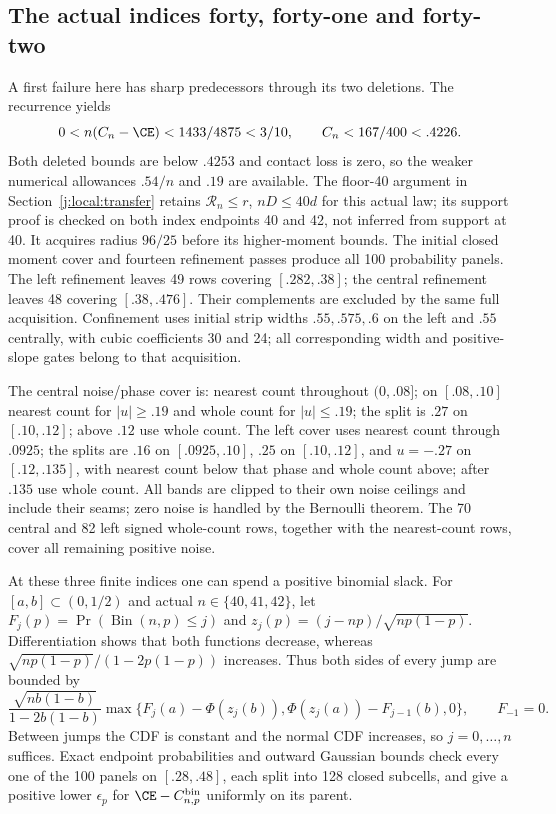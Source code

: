 \subsection{The actual indices forty, forty-one and forty-two}
\label{j:finite:4042}
A first failure here has sharp predecessors through its two deletions.
The recurrence yields
\[
0<n(C_n-\CE)<1433/4875<3/10,\qquad C_n<167/400<.4226.
\]
Both deleted bounds are below $.4253$ and contact loss is zero, so the
weaker numerical allowances $.54/n$ and $.19$ are available.
The floor-40 argument in Section~\ref{j:local:transfer} retains
$\mathcal R_n\le r$, $nD\le40d$ for this actual law; its support
proof is checked on both index endpoints 40 and 42, not inferred from
support at 40. It acquires radius $96/25$ before its higher-moment bounds.
The initial closed moment cover and fourteen refinement passes produce
all 100 probability panels. The left refinement leaves 49 rows covering
$[.282,.38]$; the central refinement leaves 48 covering $[.38,.476]$.
Their complements are excluded by the same full acquisition.
Confinement uses initial strip widths $.55,.575,.6$ on the left and
$.55$ centrally, with cubic coefficients 30 and 24; all corresponding
width and positive-slope gates belong to that acquisition.

The central noise/phase cover is: nearest count throughout $(0,.08]$;
on $[.08,.10]$ nearest count for $|u|\ge.19$ and whole count for
$|u|\le.19$; the split is $.27$ on $[.10,.12]$; above $.12$ use
whole count. The left cover uses nearest count through $.0925$;
the splits are $.16$ on $[.0925,.10]$, $.25$ on $[.10,.12]$,
and $u=-.27$ on $[.12,.135]$, with nearest count below that phase
and whole count above; after $.135$ use whole count.
All bands are clipped to their own noise ceilings and include their seams;
zero noise is handled by the Bernoulli theorem. The 70 central and
82 left signed whole-count rows, together with the nearest-count rows,
cover all remaining positive noise.

At these three finite indices one can spend a positive binomial slack.
For $[a,b]\subset(0,1/2)$ and actual $n\in\{40,41,42\}$, let
$F_j(p)=\Pr(\operatorname{Bin}(n,p)\le j)$ and
$z_j(p)=(j-np)/\sqrt{np(1-p)}$. Differentiation shows that both
functions decrease, whereas $\sqrt{np(1-p)}/(1-2p(1-p))$ increases.
Thus both sides of every jump are bounded by
\begin{equation}\label{j:finite:binomialslack}
\frac{\sqrt{nb(1-b)}}{1-2b(1-b)}
\max\{F_j(a)-\Phi(z_j(b)),\Phi(z_j(a))-F_{j-1}(b),0\},
\qquad F_{-1}=0.
\end{equation}
Between jumps the CDF is constant and the normal CDF increases, so
$j=0,\ldots,n$ suffices. Exact endpoint probabilities and outward
Gaussian bounds check every one of the 100 panels on $[.28,.48]$,
each split into 128 closed subcells, and give a positive lower
$\epsilon_p$ for $\CE-C^{\rm bin}_{n,p}$ uniformly on its parent.

